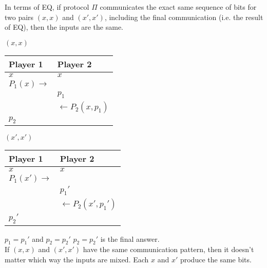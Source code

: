 \documentclass[12pt]{article}
\begin{document}
\par{In terms of EQ, if protocol $\Pi$ communicates the exact same sequence of bits for two pairs $(x, x)$ and
$(x', x')$, including the final communication (i.e. the result of EQ), then the inputs are the same.}

\begin{multicols}{2}

  $(x, x)$
  \begin{center}
    \begin{tabular}{ |m{7em}|m{7em}| } 
      \hline
      Player 1                   & Player 2 \\ [0.5ex] 
      \hline
      $x$                        & $x$ \\
      $P_{1}(x) \longrightarrow$ &  \\
                                 & $p_{1}$ \\
                                 & $\longleftarrow P_{2}(x, p_{1})$ \\
      $p_{2}$                    & \\
      \hline
    \end{tabular}
  \end{center}

\columnbreak

  $(x', x')$
  \begin{center}
    \begin{tabular}{ |m{7em}|m{7em}| } 
      \hline
      Player 1                   & Player 2 \\ [0.5ex] 
      \hline
      $x$                        & $x$ \\
      $P_{1}(x') \longrightarrow$ &  \\
                                 & $p_{1}'$ \\
                                 & $\longleftarrow P_{2}(x', p_{1}')$ \\
      $p_{2}'$                   & \\
      \hline
    \end{tabular}
  \end{center}

\end{multicols}

$p_{1} = p_{1}'$ and $p_{2} = p_{2}'$
$p_{2} = p_{2}'$ is the final answer.
\\

If $(x, x)$ and $(x', x')$ have the same communication pattern, then it doesn't matter which way the inputs are mixed.
Each $x$ and $x'$ produce the same bits.
\\
\end{document}
